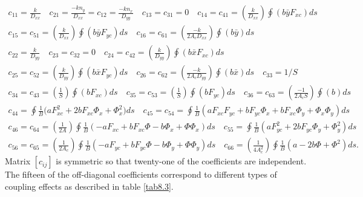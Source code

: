 \documentclass{AeroStructure-ERJohnson}
\begin{document}
\begin{gather}
c_{11}=\frac{k}{D_{x x}} \quad c_{21}=\frac{-k n_{y}}{D_{x
x}}=c_{12}=\frac{-k n_{x}}{D_{y y}} \quad c_{13}=c_{31}=0 \quad
c_{14}=c_{41}=\left(\frac{k}{D_{x x}}\right) \oint\left(b \bar{y}
F_{x c}\right) d s\label{eq8.105}\\[-1pt]
c_{15}=c_{51}=\left(\frac{k}{D_{x x}}\right) \oint\left(b \bar{y}
F_{y c}\right) d s \quad c_{16}=c_{61}=\left(\frac{-k}{2 A_{c}
D_{x x}}\right) \oint(b \bar{y}) d s\label{eq8.106}\\[-1pt]
c_{22}=\frac{k}{D_{y y}} \quad c_{23}=c_{32}=0 \quad
c_{24}=c_{42}=\left(\frac{k}{D_{y y}}\right) \oint\left(b \bar{x}
F_{x c}\right) d s\label{eq8.107}\\[-1pt]
c_{25}=c_{52}=\left(\frac{k}{D_{y y}}\right) \oint\left(b \bar{x}
F_{y c}\right) d s \quad c_{26}=c_{62}=\left(\frac{-k}{2 A_{c}
D_{y y}}\right) \oint(b \bar{x}) d s \quad c_{33}=1/
S\label{eq8.108}\\[-1pt]
c_{34}=c_{43}=\left(\frac{1}{S}\right) \oint\left(b F_{x c}\right)
d s \quad c_{35}=c_{53}=\left(\frac{1}{S}\right) \oint\left(b F_{y
c}\right) d s \quad c_{36}=c_{63}=\left(\frac{-1}{2 A_{c}
S}\right) \oint(b) d s\label{eq8.109}\\[-1pt]
c_{44}=\oint \frac{1}{B}\big(a F_{x c}^{2}+2 b F_{x c}
\Phi_{x}+\Phi_{x}^{2}\big) d s \quad c_{45}=c_{54}=\oint
\frac{1}{B}\left(a F_{x c} F_{y c}+b F_{y c} \Phi_{x}+b F_{x c}
\Phi_{y}+\Phi_{x} \Phi_{y}\right) d s\label{eq8.110}\\[-1pt]
c_{46}=c_{64}=\left(\frac{1}{2 A}\right) \oint \frac{1}{B}\left(-a
F_{x c}+b F_{x c} \Phi-b \Phi_{x}+\Phi \Phi_{x}\right) d s \quad
c_{55}=\oint \frac{1}{B}\left(a F_{y c}^{2}+2 b F_{y c}
\Phi_{y}+\Phi_{y}^{2}\right) d s\label{eq8.111}\\[-1pt]
c_{56}=c_{65}=\left(\frac{1}{2 A_{c}}\right) \oint\frac{1}{B}\left(-a
F_{y c}+b F_{y c} \Phi-b \Phi_{y}+\Phi \Phi_{y}\right) d s \quad
c_{66}=\left(\frac{1}{4 A_{c}^{2}}\right) \oint
\frac{1}{B}\left(a-2 b \Phi+\Phi^{2}\right) d s.\label{eq8.112}
\end{gather}
Matrix $[c_{i j}]$ is symmetric so that twenty-one of the
coefficients are independent. The fifteen of the off-diagonal
coefficients correspond to different types of coupling effects as
described in table \ref{tab8.3}.
\end{document}
